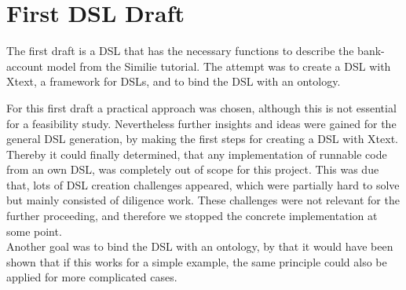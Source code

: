 \section{First DSL Draft}
\par
The first draft is a DSL that has the necessary functions to describe the bank-account model from the Similie \autocite{dsl:similie_tutorial_bank} tutorial. The attempt was to create a DSL with Xtext, a framework for DSLs, and to bind the DSL with an ontology.  
\par
For this first draft a practical approach was chosen, although this is not essential for a feasibility study. Nevertheless further insights and ideas were gained for the general DSL generation, by making the first steps for creating a DSL with Xtext. Thereby it could finally determined, that any implementation of runnable code from an own DSL, was completely out of scope for this project. This was due that, lots of DSL creation challenges appeared, which were partially hard to solve but mainly consisted of diligence work. These challenges were not relevant for the further proceeding, and therefore we stopped the concrete implementation at some point.\\
Another goal was to bind the DSL with an ontology, by that it would have been shown that if this works for a simple example, the same principle could also be applied for more complicated cases. 

